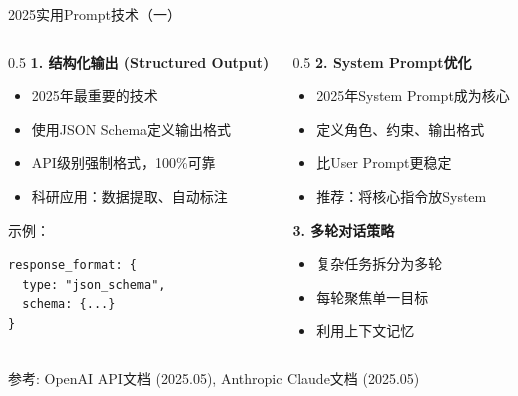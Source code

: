 \documentclass[aspectratio=169,11pt]{beamer}
\begin{document}
\begin{frame}{2025实用Prompt技术（一）}
    \begin{columns}
        \begin{column}{0.5\textwidth}
            \textbf{1. 结构化输出 (Structured Output)}
            \begin{itemize}
                \item 2025年最重要的技术
                \item 使用JSON Schema定义输出格式
                \item API级别强制格式，100\%可靠
                \item 科研应用：数据提取、自动标注
            \end{itemize}
            
            \vspace{0.2cm}
            {\scriptsize 示例：}
            \begin{exampleblock}{}
                \tiny
                \texttt{response\_format: \{}\\
                \texttt{~~type: "json\_schema",}\\
                \texttt{~~schema: \{...\}}\\
                \texttt{\}}
            \end{exampleblock}
        \end{column}
        \begin{column}{0.5\textwidth}
            \textbf{2. System Prompt优化}
            \begin{itemize}
                \item 2025年System Prompt成为核心
                \item 定义角色、约束、输出格式
                \item 比User Prompt更稳定
                \item 推荐：将核心指令放System
            \end{itemize}
            
            \vspace{0.2cm}
            \textbf{3. 多轮对话策略}
            \begin{itemize}
                \item 复杂任务拆分为多轮
                \item 每轮聚焦单一目标
                \item 利用上下文记忆
            \end{itemize}
        \end{column}
    \end{columns}
    \vspace{0.2cm}
    {\scriptsize 参考: OpenAI API文档 (2025.05), Anthropic Claude文档 (2025.05)}
\end{frame}
\end{document}
